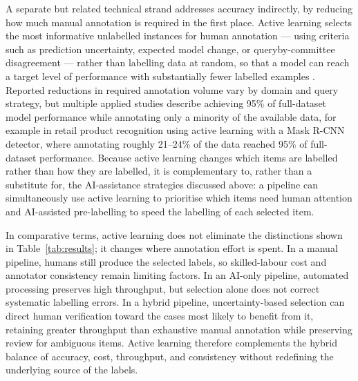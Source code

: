 \documentclass[acmsmall,nonacm]{acmart}
\begin{document}
A separate but related technical strand addresses accuracy indirectly, by reducing how much manual annotation is required in the first place. Active learning selects the most informative unlabelled instances for human annotation --- using criteria such as prediction uncertainty, expected model change, or queryby-committee disagreement --- rather than labelling data at random, so that a model can reach a target level of performance with substantially fewer labelled examples \citep{settles2009active}. Reported reductions in required annotation volume vary by domain and query strategy, but multiple applied studies describe achieving 95\% of full-dataset model performance while annotating only a minority of the available data, for example in retail product recognition using active learning with a Mask R-CNN detector, where annotating roughly 21--24\% of the data reached 95\% of full-dataset performance. Because active learning changes which items are labelled rather than how they are labelled, it is complementary to, rather than a substitute for, the AI-assistance strategies discussed above: a pipeline can simultaneously use active learning to prioritise which items need human attention and AI-assisted pre-labelling to speed the labelling of each selected item.

In comparative terms, active learning does not eliminate the distinctions shown in Table~\ref{tab:results}; it changes where annotation effort is spent. In a manual pipeline, humans still produce the selected labels, so skilled-labour cost and annotator consistency remain limiting factors. In an AI-only pipeline, automated processing preserves high throughput, but selection alone does not correct systematic labelling errors. In a hybrid pipeline, uncertainty-based selection can direct human verification toward the cases most likely to benefit from it, retaining greater throughput than exhaustive manual annotation while preserving review for ambiguous items. Active learning therefore complements the hybrid balance of accuracy, cost, throughput, and consistency without redefining the underlying source of the labels.
\end{document}
